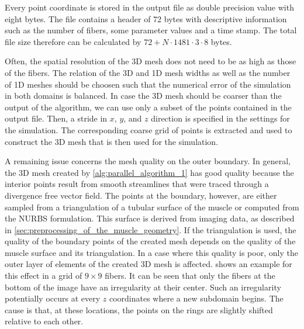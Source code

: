 Every point coordinate is stored in the output file as double precision value with eight bytes. The file contains a header of 72 bytes with descriptive information such as the number of fibers, some parameter values and a time stamp. The total file size therefore can be calculated by $72+N\cdot 1481\cdot 3\cdot 8$ bytes.

Often, the spatial resolution of the 3D mesh does not need to be as high as those of the fibers. The relation of the 3D and 1D mesh widths as well as the number of 1D meshes should be choosen such that the numerical error of the simulation in both domains is balanced.
In case the 3D mesh should be coarser than the output of the algorithm, we can use only a subset of the points contained in the output file. Then, a stride in $x$, $y$, and $z$ direction is specified in the settings for the simulation. The corresponding coarse grid of points is extracted and used to construct the 3D mesh that is then used for the simulation.


A remaining issue concerns the mesh quality on the outer boundary. In general, the 3D mesh created by \cref{alg:parallel_algorithm_1} has good quality because the interior points result from smooth streamlines that were traced through a divergence free vector field. 
The points at the boundary, however, are either sampled from a triangulation of a tubular surface of the muscle or computed from the NURBS formulation. This surface is derived from imaging data, as described in \cref{sec:preprocessing_of_the_muscle_geometry}. If the triangulation is used, the quality of the boundary points of the created mesh depends on the quality of the muscle surface and its triangulation. In a case where this quality is poor, only the outer layer of elements of the created 3D mesh is affected.  shows an example for this effect in a grid of $9 \times 9$ fibers. It can be seen that only the fibers at the bottom of the image have an irregularity at their center. Such an irregularity potentially occurs at every $z$ coordinates where a new subdomain begins. The cause is that, at these locations, the points on the rings are slightly shifted relative to each other.

